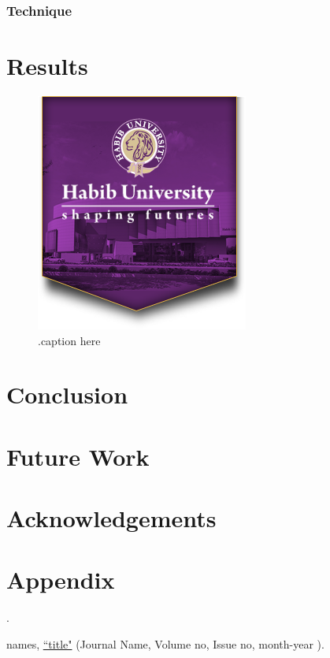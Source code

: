 \documentclass[12pt]{article}
\begin{document}
\subsubsection{Technique}


\newpage
\section{Results}
\begin{figure}[H] \begin{center}
     \includegraphics[width=0.8\columnwidth]{logo.png}
        \caption{
                .caption here
        } \end{center}
\end{figure} 


\section{Conclusion}

\newpage

\section{Future Work}

\section{Acknowledgements}

\section{Appendix}
.

\begin{thebibliography}{99}


names, \href{https://jstor.org }{``title"} %
(Journal Name, Volume no, Issue no, month-year ).

\end{thebibliography}
\end{document}
